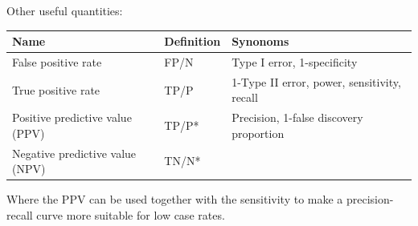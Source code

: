 \documentclass[
  ignorenonframetext,
]{beamer}
\begin{document}
\begin{frame}

Other useful quantities:

\begin{longtable}[]{@{}lll@{}}
\toprule
\begin{minipage}[b]{0.36\columnwidth}\raggedright
Name\strut
\end{minipage} & \begin{minipage}[b]{0.20\columnwidth}\raggedright
Definition\strut
\end{minipage} & \begin{minipage}[b]{0.36\columnwidth}\raggedright
Synonoms\strut
\end{minipage}\tabularnewline
\midrule
\endhead
\begin{minipage}[t]{0.36\columnwidth}\raggedright
False positive rate\strut
\end{minipage} & \begin{minipage}[t]{0.20\columnwidth}\raggedright
FP/N\strut
\end{minipage} & \begin{minipage}[t]{0.36\columnwidth}\raggedright
Type I error, 1-specificity\strut
\end{minipage}\tabularnewline
\begin{minipage}[t]{0.36\columnwidth}\raggedright
True positive rate\strut
\end{minipage} & \begin{minipage}[t]{0.20\columnwidth}\raggedright
TP/P\strut
\end{minipage} & \begin{minipage}[t]{0.36\columnwidth}\raggedright
1-Type II error, power, sensitivity, recall\strut
\end{minipage}\tabularnewline
\begin{minipage}[t]{0.36\columnwidth}\raggedright
Positive predictive value (PPV)\strut
\end{minipage} & \begin{minipage}[t]{0.20\columnwidth}\raggedright
TP/P*\strut
\end{minipage} & \begin{minipage}[t]{0.36\columnwidth}\raggedright
Precision, 1-false discovery proportion\strut
\end{minipage}\tabularnewline
\begin{minipage}[t]{0.36\columnwidth}\raggedright
Negative predictive value (NPV)\strut
\end{minipage} & \begin{minipage}[t]{0.20\columnwidth}\raggedright
TN/N*\strut
\end{minipage} & \begin{minipage}[t]{0.36\columnwidth}\raggedright
\strut
\end{minipage}\tabularnewline
\bottomrule
\end{longtable}

Where the PPV can be used together with the sensitivity to make a
precision-recall curve more suitable for low case rates.

\end{frame}
\end{document}
